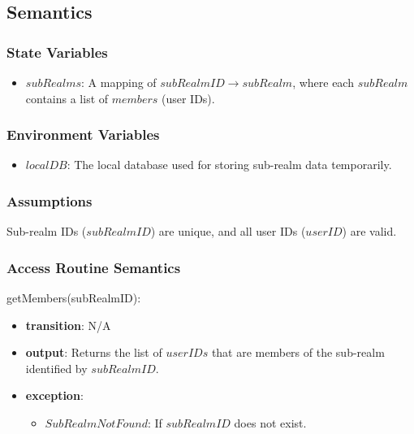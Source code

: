 \documentclass[12pt, titlepage]{article}
\begin{document}
\subsection{Semantics}

\subsubsection{State Variables}

\begin{itemize}
  \item \( subRealms \): A mapping of \( subRealmID \to subRealm \), where each \( subRealm \) contains a list of \( members \) (user IDs).
\end{itemize}

\subsubsection{Environment Variables}

\begin{itemize}
  \item \( localDB \): The local database used for storing sub-realm data temporarily.
\end{itemize}

\subsubsection{Assumptions}

Sub-realm IDs (\( subRealmID \)) are unique, and all user IDs (\( userID \)) are valid.

\subsubsection{Access Routine Semantics}

\noindent getMembers(subRealmID):
\begin{itemize}
  \item \textbf{transition}: N/A
  \item \textbf{output}: Returns the list of \( userIDs \) that are members of the sub-realm identified by \( subRealmID \).
  \item \textbf{exception}:
        \begin{itemize}
          \item \( SubRealmNotFound \): If \( subRealmID \) does not exist.
        \end{itemize}
\end{itemize}
\end{document}
